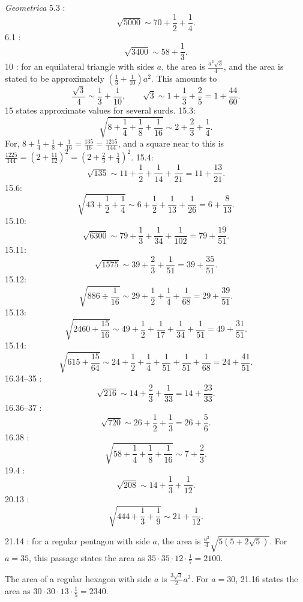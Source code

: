 \documentclass{article}
\theoremstyle{definition}
\begin{document}
{\em Geometrica} 5.3 \cite[p.~203]{heronisIV}: 
\[
\sqrt{5000} \sim 70 + \frac{1}{2}+\frac{1}{4}.
\]
6.1 \cite[p.~209]{heronisIV}:
\[
\sqrt{3400} \sim 58 + \frac{1}{3}.
\]
10 \cite[p.~223]{heronisIV}: for an equilateral triangle with sides $a$, the area
is $\frac{a^2 \sqrt{3}}{4}$, and the area is stated to be
approximately $\left(\frac{1}{3} + \frac{1}{10} \right)a^2$. This amounts to
\[
\frac{\sqrt{3}}{4} \sim \frac{1}{3}+\frac{1}{10},\qquad
\sqrt{3} \sim 1+\frac{1}{3}+\frac{2}{5} = 1+\frac{44}{60}.
\]
15 \cite[pp.~286--301]{heronisIV} states approximate values for several surds.
15.3:\[
\sqrt{8+\frac{1}{4}+\frac{1}{8}+\frac{1}{16}} \sim
2+\frac{2}{3}+\frac{1}{4}.
\]
For,
$8+\frac{1}{4}+\frac{1}{8}+\frac{1}{16}=\frac{135}{16}=\frac{1215}{144}$, and a square near to this is
$\frac{1225}{144}=\left(2+\frac{11}{12}\right)^2=\left(2+\frac{2}{3}+\frac{1}{4}\right)^2$. 
15.4:
\[
\sqrt{135} \sim 11+\frac{1}{2}+\frac{1}{14}+\frac{1}{21}=11+\frac{13}{21}.
\]
15.6: 
\[
\sqrt{43+\frac{1}{2}+\frac{1}{4}} \sim 6+\frac{1}{2}+\frac{1}{13}+\frac{1}{26}=6+\frac{8}{13}.
\]
15.10:
\[
\sqrt{6300} \sim 79+\frac{1}{3}+\frac{1}{34}+\frac{1}{102} = 79+\frac{19}{51}.
\]
15.11:
\[
\sqrt{1575} \sim 39 + \frac{2}{3}+\frac{1}{51}= 39+\frac{35}{51}.
\]
15.12:
\[
\sqrt{886 \div \frac{1}{16}} \sim 29+\frac{1}{2}+\frac{1}{4}+\frac{1}{68} = 29 + \frac{39}{51}.
\]
15.13:
\[
\sqrt{2460+\frac{15}{16}} \sim 49 + \frac{1}{2}+\frac{1}{17}+\frac{1}{34}+\frac{1}{51} = 49 + \frac{31}{51}.
\]
15.14:
\[
\sqrt{615+\frac{15}{64}} \sim 24+ \frac{1}{2}+\frac{1}{4}+\frac{1}{51}+\frac{1}{51}+\frac{1}{68} = 24+\frac{41}{51}.
\]
16.34--35 \cite[p.~323]{heronisIV}:
\[
\sqrt{216} \sim 14+\frac{2}{3}+\frac{1}{33} = 14+\frac{23}{33}.
\]
16.36--37 \cite[p.~325]{heronisIV}:
\[
\sqrt{720} \sim 26+\frac{1}{2}+\frac{1}{3} = 26+\frac{5}{6}.
\]
16.38 \cite[p.~327]{heronisIV}:
\[
\sqrt{58+\frac{1}{4}+\frac{1}{8}+\frac{1}{16}} \sim 7 +\frac{2}{3}.
\]
19.4 \cite[p.~359]{heronisIV}:
\[
\sqrt{208} \sim 14 + \frac{1}{3}+\frac{1}{12}.
\]
20.13 \cite[p.~373]{heronisIV}:
\[
\sqrt{444+\frac{1}{3}+\frac{1}{9}} \sim 21 + \frac{1}{12}.
\]

21.14 \cite[p.~383]{heronisIV}: for a regular pentagon with side $a$, the area is
$\frac{a^2}{4}\sqrt{5(5+2\sqrt{5})}$. For $a=35$, 
this passage states the area as $35 \cdot 35 \cdot 12 \cdot \frac{1}{7} = 2100$.

The area of a regular hexagon with side $a$ is $\frac{3\sqrt{3}}{2}a^2$. For $a=30$, 
21.16 states the area as $30 \cdot 30 \cdot 13 \cdot \frac{1}{5} = 2340$. 
\end{document}
